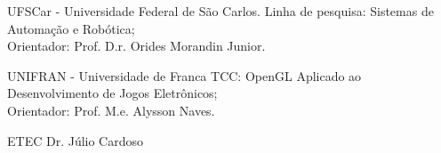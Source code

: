 
{UFSCar - Universidade Federal de São Carlos.}
{Linha de pesquisa: Sistemas de Automação e Robótica;\\
Orientador: Prof. D.r. Orides Morandin Junior.}
\sepspace

{UNIFRAN - Universidade de Franca}
{TCC: OpenGL Aplicado ao Desenvolvimento de Jogos Eletrônicos;\\
Orientador: Prof. M.e. Alysson Naves.}
\sepspace

{ETEC Dr. Júlio Cardoso}{}
